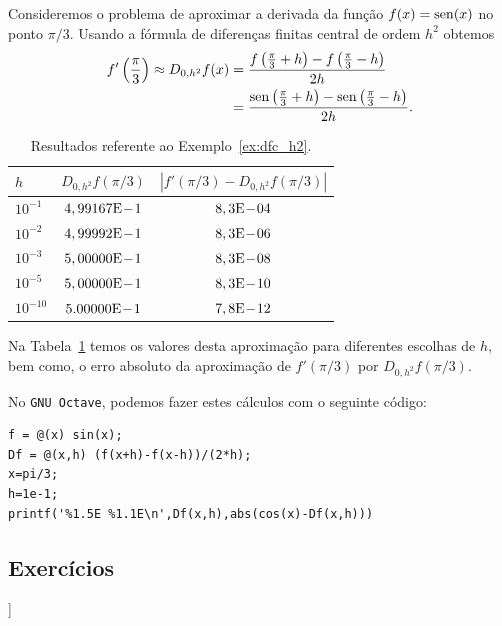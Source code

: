 \begin{ex}\label{ex:dfc_h2}
  Consideremos o problema de aproximar a derivada da função $f(x) = \operatorname{sen}(x)$ no ponto $\pi/3$. Usando a fórmula de diferenças finitas central de ordem $h^2$ obtemos
  \begin{align}
    f'\left(\frac{\pi}{3}\right) \approx D_{0,h^2}f(x) &= \frac{f\left(\frac{\pi}{3}+h\right)-f\left(\frac{\pi}{3}-h\right)}{2h}\\
          &= \frac{\operatorname{sen}\left(\frac{\pi}{3}+h\right)-\operatorname{sen}\left(\frac{\pi}{3}-h\right)}{2h}. 
  \end{align}

\begin{table}[h!]
  \centering
  \caption{Resultados referente ao Exemplo~\ref{ex:dfc_h2}.}
  \begin{tabular}{l|c|c}
    $h$ & $D_{0,h^2}f(\pi/3)$ & $|f'(\pi/3)-D_{0,h^2}f(\pi/3)|$\\ \hline
    $10^{-1}$ & $4,99167\mathrm{E}\!-\!1$ & $8,3\mathrm{E}\!-\!04$ \\
    $10^{-2}$ & $4,99992\mathrm{E}\!-\!1$ & $8,3\mathrm{E}\!-\!06$ \\
    $10^{-3}$ & $5,00000\mathrm{E}\!-\!1$ & $8,3\mathrm{E}\!-\!08$ \\
    $10^{-5}$ & $5,00000\mathrm{E}\!-\!1$ & $8,3\mathrm{E}\!-\!10$ \\
    $10^{-10}$ & $5.00000\mathrm{E}\!-\!1$ & $7,8\mathrm{E}\!-\!12$ \\\hline
  \end{tabular}
  \label{tab:ex_dfc_h2}
\end{table}

Na Tabela~\ref{tab:ex_dfc_h2} temos os valores desta aproximação para diferentes escolhas de $h$, bem como, o erro absoluto da aproximação de $f'(\pi/3)$ por $D_{0,h^2}f(\pi/3)$.

No \verb+GNU Octave+, podemos fazer estes cálculos com o seguinte código:
\begin{verbatim}
f = @(x) sin(x);
Df = @(x,h) (f(x+h)-f(x-h))/(2*h);
x=pi/3;
h=1e-1;
printf('%1.5E %1.1E\n',Df(x,h),abs(cos(x)-Df(x,h)))
\end{verbatim}
\end{ex}

\subsection*{Exercícios}

\begin{flushleft}
  [[tag:revisar]]
\end{flushleft}

